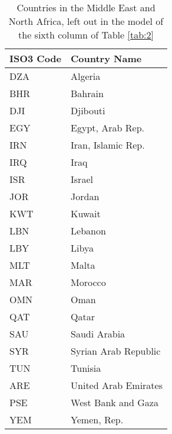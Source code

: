 \documentclass[../main.tex]{subfiles}
\begin{document}
\begin{table}[H]
\centering
\caption{Countries in the Middle East and North Africa, left out in the model of the sixth column of Table \ref{tab:2}}
\label{tab:mena}
\begin{tabular}{ll}
\toprule
\textbf{ISO3 Code} & \textbf{Country Name }        \\
\midrule
DZA       & Algeria              \\
BHR       & Bahrain              \\
DJI       & Djibouti             \\
EGY       & Egypt, Arab Rep.     \\
IRN       & Iran, Islamic Rep.   \\
IRQ       & Iraq                 \\
ISR       & Israel               \\
JOR       & Jordan               \\
KWT       & Kuwait               \\
LBN       & Lebanon              \\
LBY       & Libya                \\
MLT       & Malta                \\
MAR       & Morocco              \\
OMN       & Oman                 \\
QAT       & Qatar                \\
SAU       & Saudi Arabia         \\
SYR       & Syrian Arab Republic \\
TUN       & Tunisia              \\
ARE       & United Arab Emirates \\
PSE       & West Bank and Gaza   \\
YEM       & Yemen, Rep.         \\
\bottomrule
\end{tabular}
\end{table}
\clearpage
\end{document}
